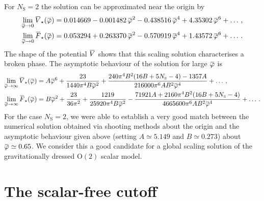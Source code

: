 \documentclass[11pt]{book}
\newcommand{\overbar}[1]{\mkern 1.5mu\overline{\mkern-1.5mu#1\mkern-1.5mu}\mkern 1.5mu}
\newcommand\NS{ N_{\scriptscriptstyle{\mathrm{S}}} }
\newcommand{\bV}{\overbar V}
\newcommand{\bF}{\overbar F}
\newcommand{\bVstar}{\bV_\star}
\newcommand{\bFstar}{\bF_\star}
\newcommand{\bp}{\overbar \varphi}
\numberwithin{equation}{chapter}
\begin{document}

\noindent For $\NS=2$ the solution can be approximated near the origin by
\begin{align}
  \lim_{\bp \rightarrow 0} \bVstar(\bp) &= 0.014669 - 0.001482 \, \bp ^2 - 0.438516 \, \bp ^4 + 4.35302 \, \bp ^6 + \dots \,, \\
  \lim_{\bp \rightarrow 0} \bFstar(\bp) &= 0.053294 + 0.263370 \, \bp ^2 - 0.570919 \, \bp ^4 + 1.43572 \, \bp ^6 + \dots \,.
\end{align}
The shape of the potential $\bV$ shows that this scaling solution characterises a broken phase.
The asymptotic behaviour of the solution for large $\bp$ is
\begin{align}
  \lim_{\bp \rightarrow \infty} \bVstar(\bp) &= A \bp ^6 + \frac{23}{1440 \pi ^4 B \bp ^2}
                     + \frac{240 \pi ^4 B^2 (16 B+5 \NS-4)-1357 A}{216000 \pi ^6 A B^2 \bp ^4} + \dots \,, \\
  \lim_{\bp \rightarrow \infty} \bFstar(\bp) &= B \bp ^2 + \frac{23}{36 \pi ^2}+\frac{1219}{25920 \pi ^4 B \bp ^2}
                     - \frac{71921 A+2160 \pi ^4 B^2 (16 B+5 \NS-4)}{4665600 \pi ^6 A B^2 \bp ^4} + \dots \,.
\end{align}
For the case $\NS=2$, we were able to establish a very good match between the numerical solution
obtained via shooting methods about the origin and the asymptotic behaviour given above
(setting $A\simeq 5.149$ and $B\simeq 0.273$) about $\bp\simeq0.65$.
We consider this a good candidate for a global scaling solution of the gravitationally
dressed ${\mathrm O(2)}$ scalar model.


\section{The scalar-free cutoff}
\label{sec:purecutoff}
\end{document}
